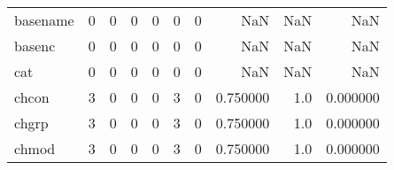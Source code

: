 \begin{tabular}{lrrrrrrrrr}
basename  &                                       0 &                                                  0 &                                                  0 &                                                  0 &                                                  0 &                                                  0 &                                                NaN &                                    NaN &                                  NaN \\
basenc    &                                       0 &                                                  0 &                                                  0 &                                                  0 &                                                  0 &                                                  0 &                                                NaN &                                    NaN &                                  NaN \\
cat       &                                       0 &                                                  0 &                                                  0 &                                                  0 &                                                  0 &                                                  0 &                                                NaN &                                    NaN &                                  NaN \\
chcon     &                                       3 &                                                  0 &                                                  0 &                                                  0 &                                                  3 &                                                  0 &                                           0.750000 &                                    1.0 &                             0.000000 \\
chgrp     &                                       3 &                                                  0 &                                                  0 &                                                  0 &                                                  3 &                                                  0 &                                           0.750000 &                                    1.0 &                             0.000000 \\
chmod     &                                       3 &                                                  0 &                                                  0 &                                                  0 &                                                  3 &                                                  0 &                                           0.750000 &                                    1.0 &                             0.000000 \\

\end{tabular}
